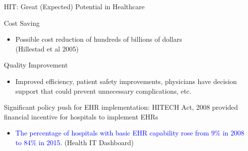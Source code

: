 \documentclass[10pt]{beamer}
\begin{document}
\begin{frame}[fragile]{HIT: Great (Expected) Potential in Healthcare}
\begin{alertblock}{Cost Saving}
\begin{itemize}
    \item Possible cost reduction of hundreds of billions of dollars \\ \scriptsize (Hillestad et al 2005)
\end{itemize}
\end{alertblock}

\begin{alertblock}{Quality Improvement}
\begin{itemize}
    \item Improved efficiency, patient safety improvements, physicians have decision support that could prevent unnecessary complications, etc.
\end{itemize}
\end{alertblock}

\vspace{4mm}

Significant policy push for EHR implementation: HITECH Act, 2008 provided financial incentive for hospitals to implement EHRs
\begin{itemize}
    \item \textcolor{blue}{The percentage of hospitals with basic EHR capability rose from 9$\%$ in 2008 to 84$\%$ in 2015.} \scriptsize (Health IT Dashboard)
\end{itemize}
\end{frame}
\end{document}
